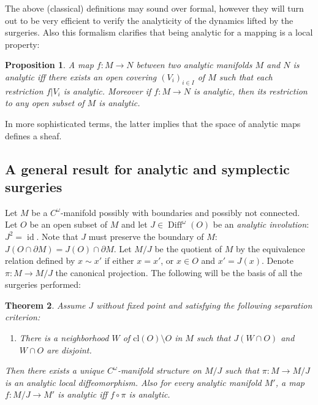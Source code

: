 \documentclass[JEP,XML,SOM,Unicode,NoFloatCountersInSection,Unicode,published]{cedram}
\newcommand{\cl}{\mathrm{cl}}
\DeclareMathOperator{\id}{id}
\DeclareMathOperator\Diff{Diff}
\newtheorem{proposition}{Proposition}[section]
\newtheorem{theorem}[proposition]{Theorem}
\theoremstyle{definition}
\begin{document}
The above (classical) definitions may sound over formal, however they will turn out to be very efficient to verify the analyticity of the dynamics lifted by the surgeries. Also this formalism clarifies that being analytic for a mapping is a local property:

\begin{proposition}\label{sheaf}
A map $f: M\to N$ between two analytic manifolds $M$ and $N$ is analytic iff
there exists an open covering $(V_i)_{i\in I}$ of $M$ such that each restriction $f|V_i$ is analytic.
Moreover if $f: M\to N$ is analytic, then its restriction to any open subset of $M$ is analytic.
\end{proposition}
In more sophisticated terms, the latter implies that the space of analytic maps defines a sheaf.

\subsection{A general result for analytic and symplectic surgeries}\label{S22}
Let $M$ be a $C^\omega$-manifold possibly with boundaries and possibly not connected. Let $O$ be an open subset of $M$ and let $J\in \Diff^\omega(O)$ be an \emph{analytic involution}: $J^2=\id$.
Note that $J$ must preserve the boundary of $M$: $J(O \cap \partial M)= J(O)\cap \partial M$. Let $M/J$ be the quotient of $M$ by the equivalence relation defined by $x\sim x'$ if either $x=x'$, or $x\in O $ and $x'= J(x)$.
Denote $\pi: M\to M/J$ the canonical projection.
The following will be the basis of all the surgeries performed:

\begin{theorem}\label{gluing} Assume $J$ without fixed point and satisfying the following separation criterion:
\begin{enumerate}\renewcommand{\theenumi}{C}
\item\label{enum:C}
There is a neighborhood $W $ of $\cl(O)\setminus O $ in $M$ such that $J(W\cap O)$ and $W \cap O $ are disjoint.
\end{enumerate}
Then there exists a unique $C^\omega$-manifold structure on $M/J$ such that $\pi: M\to M/J$ is an analytic local diffeomorphism. Also for every analytic manifold $M'$, a map $f: M/J \to M'$ is analytic iff $f\circ \pi $ is analytic.
\end{theorem}
\end{document}
